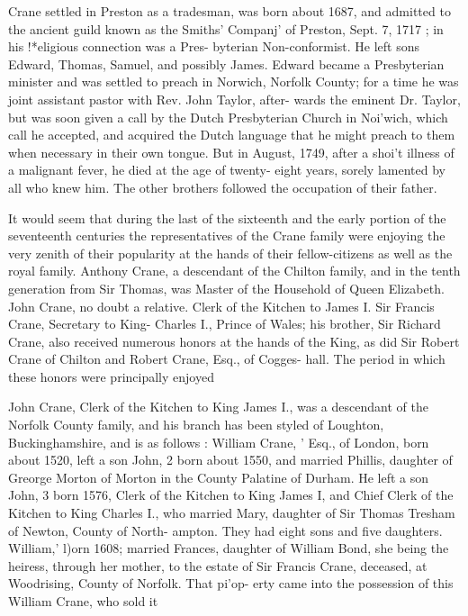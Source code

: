 \documentclass[oneside]{book}
\begin{document}
Crane settled in Preston as a tradesman, was born about 1687, 
and admitted to the ancient guild known as the Smiths' Companj' 
of Preston, Sept. 7, 1717 ; in his !*eligious connection was a Pres- 
byterian Non-conformist. He left sons Edward, Thomas, Samuel, 
and possibly James. Edward became a Presbyterian minister 
and was settled to preach in Norwich, Norfolk County; for a 
time he was joint assistant pastor with Rev. John Taylor, after- 
wards the eminent Dr. Taylor, but was soon given a call by the 
Dutch Presbyterian Church in Noi'wich, which call he accepted, 
and acquired the Dutch language that he might preach to them 
when necessary in their own tongue. But in August, 1749, after 
a shoi't illness of a malignant fever, he died at the age of twenty- 
eight years, sorely lamented by all who knew him. The other 
brothers followed the occupation of their father. 

It would seem that during the last of the sixteenth and the 
early portion of the seventeenth centuries the representatives of 
the Crane family were enjoying the very zenith of their popularity 
at the hands of their fellow-citizens as well as the royal family. 
Anthony Crane, a descendant of the Chilton family, and in the 
tenth generation from Sir Thomas, was Master of the Household 
of Queen Elizabeth. John Crane, no doubt a relative. Clerk of 
the Kitchen to James I. Sir Francis Crane, Secretary to King- 
Charles I., Prince of Wales; his brother, Sir Richard Crane, 
also received numerous honors at the hands of the King, as did 
Sir Robert Crane of Chilton and Robert Crane, Esq., of Cogges- 
hall. The period in which these honors were principally enjoyed 

John Crane, Clerk of the Kitchen to King James I., was a 
descendant of the Norfolk County family, and his branch has 
been styled of Loughton, Buckinghamshire, and is as follows : 
William Crane, ' Esq., of London, born about 1520, left a son 
John, 2 born about 1550, and married Phillis, daughter of Greorge 
Morton of Morton in the County Palatine of Durham. He left a 
son John, 3 born 1576, Clerk of the Kitchen to King James I, and 
Chief Clerk of the Kitchen to King Charles I., who married Mary, 
daughter of Sir Thomas Tresham of Newton, County of North- 
ampton. They had eight sons and five daughters. William,' 
l)orn 1608; married Frances, daughter of William Bond, she 
being the heiress, through her mother, to the estate of Sir Francis 
Crane, deceased, at Woodrising, County of Norfolk. That pi'op- 
erty came into the possession of this William Crane, who sold it 
\end{document}
